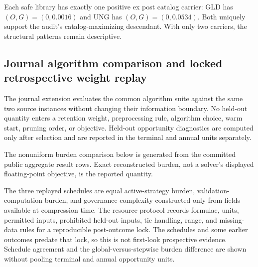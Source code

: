 Each safe library has exactly one positive ex post catalog carrier: GLD has
\((O,G)=(0,0.0016)\) and UNG has \((O,G)=(0,0.0534)\).  Both uniquely support
the audit's catalog-maximizing descendant. With only two carriers, the structural
patterns remain descriptive.

\begin{table}[htbp]
  \centering
  \scriptsize
  \renewcommand{\arraystretch}{0.92}
  
  \caption{Locked financial designs, compression diagnostics, and secondary
  coverage outcomes.  Pruning uses the validation frontier and, for
  innovation-safe deletion, structural closure.  Compression and policy
  characteristics are post-pruning descriptions.  Coverage scores are fixed
  from validation or pre-target data after compression.  The \(Q_a\) entries
  and displayed performance outcomes use held-out data and are not pruning
  inputs, forecasts, policy scores, or deployable criteria.  The audits use
  different held-out estimands.}
  \label{tab:supp-financial-design-summary}
\end{table}

\subsection{Journal algorithm comparison and locked retrospective weight replay}
\label{sec:or-financial-algorithm-robustness}

The journal extension evaluates the common algorithm suite against the same
two source instances without changing their information boundary. No held-out
quantity enters a retention weight, preprocessing rule, algorithm choice,
warm start, pruning order, or objective. Held-out opportunity diagnostics are
computed only after selection and are reported in the terminal and annual
units separately.



The nonuniform burden comparison below is generated from the committed public
aggregate result rows. Exact reconstructed burden, not a solver's displayed
floating-point objective, is the reported quantity.



The three replayed schedules are equal active-strategy burden,
validation-computation burden, and governance complexity constructed only from
fields available at compression time. The resource protocol records formulae,
units, permitted inputs, prohibited held-out inputs, tie handling, range, and
missing-data rules for a reproducible post-outcome lock. The schedules and some
earlier outcomes predate that lock, so this is not first-look prospective
evidence. Schedule agreement and the
global-versus-stepwise burden difference are shown without pooling terminal and
annual opportunity units.

